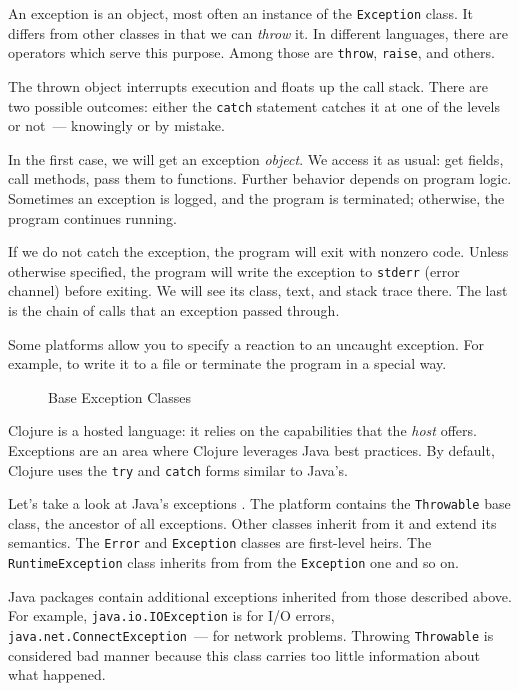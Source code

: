 An exception is an object, most often an instance of the \verb|Exception| class. It differs from other classes in that we can \emph{throw} it. In different languages, there are operators which serve this purpose. Among those are \verb|throw|, \verb|raise|, and others.

The thrown object interrupts execution and floats up the call stack. There are two possible outcomes: either the \verb|catch| statement catches it at one of the levels or not~--- knowingly or by mistake.

In the first case, we will get an exception \emph{object}. We access it as usual: get fields, call methods, pass them to functions. Further behavior depends on program logic. Sometimes an exception is logged, and the program is terminated; otherwise, the program continues running.

If we do not catch the exception, the program will exit with nonzero code. Unless otherwise specified, the program will write the exception to \verb|stderr| (error channel) before exiting. We will see its class, text, and stack trace there. The last is the chain of calls that an exception passed through.


Some platforms allow you to specify a reaction to an uncaught exception. For example, to write it to a file or terminate the program in a special way.

\begin{figure}[ht!]
  \caption{Base Exception Classes}
  \label{fig:exceptions}
\end{figure}

Clojure is a hosted language: it relies on the capabilities that the \emph{host} offers. Exceptions are an area where Clojure leverages Java best practices. By default, Clojure uses the \verb|try| and \verb|catch| forms similar to Java's.


Let's take a look at Java's exceptions . The platform contains the \texttt{Throwable} base class, the ancestor of all exceptions. Other classes inherit from it and extend its semantics. The \verb|Error| and \verb|Exception| classes are first-level heirs. The \verb|RuntimeException| class inherits from from the \verb|Exception| one and so on.


Java packages contain additional exceptions inherited from those described above. For example, \verb|java.io.IOException| is for I/O errors, \verb|java.net.ConnectException|~--- for network problems. Throwing \verb|Throwable| is considered bad manner because this class carries too little information about what happened.

